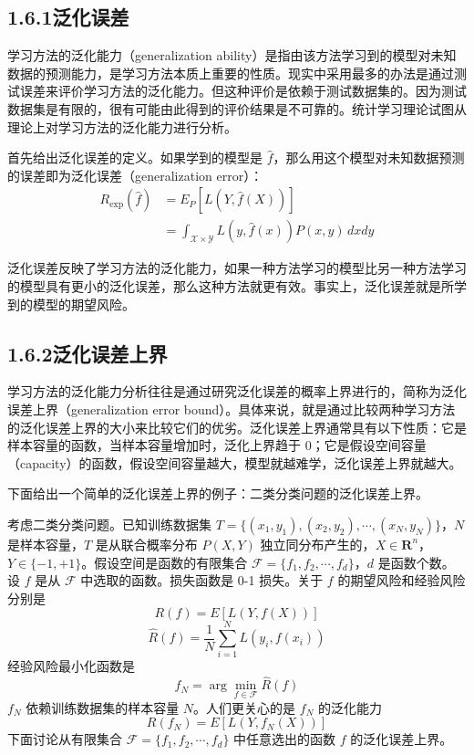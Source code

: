 \documentclass[UTF8, 12pt, fontset=fandol, oneside]{ctexart}
\begin{document}
\subsection*{1.6.1\quad 泛化误差}

学习方法的泛化能力（generalization ability）是指由该方法学习到的模型对未知数据的预测能力，是学习方法本质上重要的性质。现实中采用最多的办法是通过测试误差来评价学习方法的泛化能力。但这种评价是依赖于测试数据集的。因为测试数据集是有限的，很有可能由此得到的评价结果是不可靠的。统计学习理论试图从理论上对学习方法的泛化能力进行分析。

首先给出泛化误差的定义。如果学到的模型是 $\hat f$，那么用这个模型对未知数据预测的误差即为泛化误差（generalization error）：
\begin{equation}
\begin{aligned}
  R_{\exp}(\hat f)
  &=E_P[L(Y,\hat f(X))]\\
  &=\int_{\mathcal X\times\mathcal Y} L(y,\hat f(x))P(x,y)\,dxdy
\end{aligned}
  \tag{1.27}
\end{equation}

泛化误差反映了学习方法的泛化能力，如果一种方法学习的模型比另一种方法学习的模型具有更小的泛化误差，那么这种方法就更有效。事实上，泛化误差就是所学到的模型的期望风险。

\subsection*{1.6.2\quad 泛化误差上界}

学习方法的泛化能力分析往往是通过研究泛化误差的概率上界进行的，简称为泛化误差上界（generalization error bound）。具体来说，就是通过比较两种学习方法的泛化误差上界的大小来比较它们的优劣。泛化误差上界通常具有以下性质：它是样本容量的函数，当样本容量增加时，泛化上界趋于 0；它是假设空间容量（capacity）的函数，假设空间容量越大，模型就越难学，泛化误差上界就越大。

下面给出一个简单的泛化误差上界的例子：二类分类问题的泛化误差上界。

考虑二类分类问题。已知训练数据集 $T=\{(x_1,y_1),(x_2,y_2),\cdots,(x_N,y_N)\}$，$N$ 是样本容量，$T$ 是从联合概率分布 $P(X,Y)$ 独立同分布产生的，$X\in\mathbf R^n$，$Y\in\{-1,+1\}$。假设空间是函数的有限集合 $\mathcal F=\{f_1,f_2,\cdots,f_d\}$，$d$ 是函数个数。设 $f$ 是从 $\mathcal F$ 中选取的函数。损失函数是 0-1 损失。关于 $f$ 的期望风险和经验风险分别是
\begin{equation}
  R(f)=E[L(Y,f(X))]
  \tag{1.28}
\end{equation}
\begin{equation}
  \hat R(f)=\frac1N\sum_{i=1}^N L(y_i,f(x_i))
  \tag{1.29}
\end{equation}
经验风险最小化函数是
\begin{equation}
  f_N=\arg\min_{f\in\mathcal F}\hat R(f)
  \tag{1.30}
\end{equation}
$f_N$ 依赖训练数据集的样本容量 $N$。人们更关心的是 $f_N$ 的泛化能力
\begin{equation}
  R(f_N)=E[L(Y,f_N(X))]
  \tag{1.31}
\end{equation}
下面讨论从有限集合 $\mathcal F=\{f_1,f_2,\cdots,f_d\}$ 中任意选出的函数 $f$ 的泛化误差上界。
\end{document}
